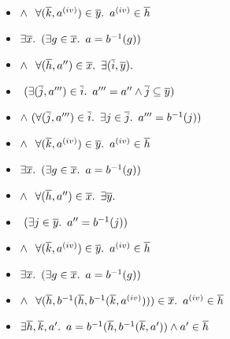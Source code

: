 \begin{itemize}
  \item[\phantom{\imps}]
    \quad\quad\quad$\land~\phantom{(}\forall (\overline{k},a^{\text (iv)})\in\overline{y}\ldotp~a^{\text (iv)}\in\overline{h}$
  \addtolength{\itemsep}{.5\baselineskip}

  \item[\iffs]
    $\exists \overline{x}\ldotp~(\exists g\in\overline{x}\ldotp~a = b^{-1}(g))$

  \addtolength{\itemsep}{-.5\baselineskip}
  \item[\phantom{\imps}]
    \quad $\land~\phantom{(}\forall(\overline{h},a^{\prime\prime})\in\overline{x}\ldotp~\exists(\overline{i},\overline{y})\ldotp$

  \item[\phantom{\imps}]
    \quad\quad\quad\phantom{$\land$}$~(\exists (\overline{j},a^{\prime\prime\prime})\in\overline{i}\ldotp~a^{\prime\prime\prime} = a^{\prime\prime}\land\overline{j}\subseteq\overline{y})$

  \item[\phantom{\imps}]
    \quad\quad\quad$\land~(\forall (\overline{j},a^{\prime\prime\prime})\in\overline{i}\ldotp~\exists j\in\overline{j}\ldotp~a^{\prime\prime\prime}=b^{-1}(j))$

  \item[\phantom{\imps}]
    \quad\quad\quad$\land~\phantom{(}\forall (\overline{k},a^{\text (iv)})\in\overline{y}\ldotp~a^{\text (iv)}\in\overline{h}$
  \addtolength{\itemsep}{.5\baselineskip}

  \item[\iffs]
    $\exists \overline{x}\ldotp~(\exists g\in\overline{x}\ldotp~a = b^{-1}(g))$

  \addtolength{\itemsep}{-.5\baselineskip}
  \item[\phantom{\imps}]
    \quad $\land~\phantom{(}\forall(\overline{h},a^{\prime\prime})\in\overline{x}\ldotp~\exists\overline{y}\ldotp$

  \item[\phantom{\imps}]
    \quad\quad\quad\phantom{$\land$}$~(\exists j\in\overline{y}\ldotp~a^{\prime\prime}=b^{-1}(j))$

  \item[\phantom{\imps}]
    \quad\quad\quad$\land~\phantom{(}\forall (\overline{k},a^{\text (iv)})\in\overline{y}\ldotp~a^{\text (iv)}\in\overline{h}$
  \addtolength{\itemsep}{.5\baselineskip}

  \item[\iffs]
    $\exists \overline{x}\ldotp~(\exists g\in\overline{x}\ldotp~a = b^{-1}(g))$

  \addtolength{\itemsep}{-.5\baselineskip}
  \item[\phantom{\imps}]
    \quad $\land~\phantom{(}\forall(\overline{h},b^{-1}(\overline{h},b^{-1}(\overline{k}, a^{\text (iv)})))\in\overline{x}\ldotp~a^{\text (iv)}\in\overline{h}$
  \addtolength{\itemsep}{.5\baselineskip}

  \item[\iffs]
    $\exists\overline{h},\overline{k},a^\prime\ldotp~a = b^{-1}(\overline{h}, b^{-1}(\overline{k},a^\prime))\land a^\prime\in\overline{h}$
\end{itemize}

